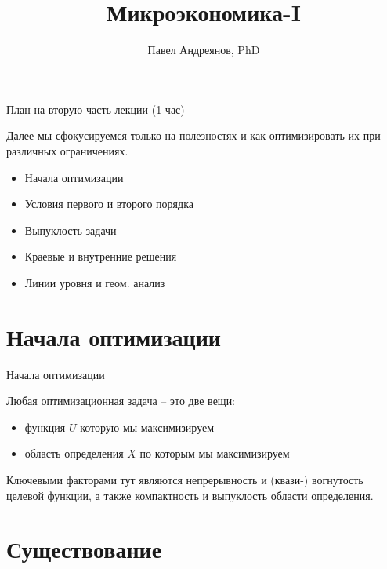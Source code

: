 \documentclass{beamer}
\title{
Микроэкономика-I
}
\author{
Павел Андреянов, PhD
}
\begin{document}
\maketitle

\begin{frame}{План на вторую часть лекции (1 час)}

Далее мы сфокусируемся только на полезностях и как оптимизировать их при различных ограничениях.

\begin{itemize}
  \item Начала оптимизации
  \item Условия первого и второго порядка
  \item Выпуклость задачи
  \item Краевые и внутренние решения
  \item Линии уровня и геом. анализ
\end{itemize}


\end{frame}

\section{Начала оптимизации}

\begin{frame}{Начала оптимизации}

Любая оптимизационная задача – это две вещи:

\begin{itemize}
  \item функция $U$ которую мы максимизируем
  \item область определения $X$ по которым мы максимизируем
\end{itemize}

Ключевыми факторами тут являются непрерывность и (квази-) вогнутость целевой функции, а также компактность и выпуклость области определения.

\end{frame}

\section{Существование}
\end{document}
